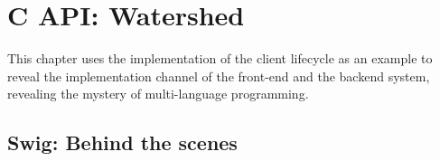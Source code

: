 \begin{savequote}[45mm]
\end{savequote}

\chapter{C API: Watershed} 
\label{ch:c-api}

\begin{content}

This chapter uses the implementation of the client lifecycle as an example to reveal the implementation channel of the front-end  and the backend \cpp{} system, revealing the mystery of  multi-language programming.

\end{content}

\section{Swig: Behind the scenes}

